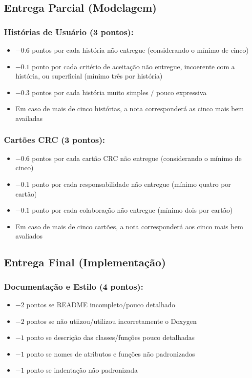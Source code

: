 \documentclass[11pt]{article}
\begin{document}
\subsection{Entrega Parcial (Modelagem)}
\label{sec:org0537b08}

\subsubsection{Histórias de Usuário (3 pontos):}
\label{sec:org17de6d6}
\begin{itemize}
\item \(-0.6\) pontos por cada história não entregue (considerando o mínimo de cinco)
\item \(-0.1\) ponto por cada critério de aceitação não entregue,
incoerente com a história, ou superficial (mínimo três por história)
\item \(-0.3\) pontos por cada história muito simples / pouco expressiva
\item Em caso de mais de cinco histórias, a nota corresponderá as cinco
mais bem availadas
\end{itemize}
\subsubsection{Cartões CRC (3 pontos):}
\label{sec:orgc1a6439}
\begin{itemize}
\item \(-0.6\) pontos por cada cartão CRC não entregue (considerando o mínimo de cinco)
\item \(-0.1\) ponto por cada responsabilidade não entregue (mínimo  quatro por cartão)
\item \(-0.1\) ponto por cada colaboração não entregue (mínimo dois por cartão)
\item Em caso de mais de cinco cartões, a nota corresponderá aos cinco
mais bem avaliados
\end{itemize}
\subsection{Entrega Final (Implementação)}
\label{sec:org2becadf}

\subsubsection{Documentação e Estilo (4 pontos):}
\label{sec:orge52f97f}
\begin{itemize}
\item \(-2\) pontos se README incompleto/pouco detalhado
\item \(-2\) pontos se não utiizou/utilizou incorretamente o Doxygen
\item \(-1\) ponto se descrição das classes/funções pouco detalhadas
\item \(-1\) ponto se nomes de atributos e funções não padronizados
\item \(-1\) ponto se indentação não padronizada
\end{itemize}
\end{document}
